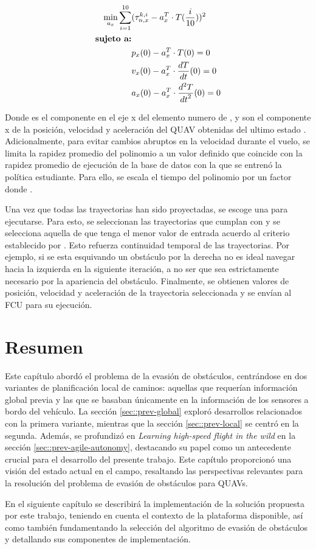 \begin{equation}
\label{eq:aoa-traj-proj}
\begin{split}
    \min_{a_x} \sum_{i=1}^{10} & (\tau_{n,x}^{k,i} - a_x^T \cdot T(\frac{i}{10}))^{2} \\
    \text{\textbf{sujeto a:}} & \\
                     & p_x(0) - a_x^T \cdot T(0) = 0 \\
                     & v_x(0) - a_x^T \cdot \frac{dT}{dt}(0) = 0 \\
                     & a_x(0) - a_x^T \cdot \frac{d^2 T}{{dt}^2}(0) = 0 \\
\end{split}
\end{equation}

Donde  es el componente en el eje x del elemento numero  de , y  son el componente x de la posición, velocidad y aceleración del QUAV obtenidas del ultimo estado . Adicionalmente, para evitar cambios abruptos en la velocidad durante el vuelo, se limita la rapidez promedio del polinomio a un valor definido  que coincide con la rapidez promedio de ejecución de la base de datos con la que se entrenó la política estudiante. Para ello, se escala el tiempo  del polinomio  por un factor  donde .

Una vez que todas las trayectorias han sido proyectadas, se escoge una para ejecutarse. Para esto, se seleccionan las trayectorias que cumplan con  y se selecciona aquella de que tenga el menor valor de entrada acuerdo al criterio establecido por \cite{mellinger2011minimum}. Esto refuerza continuidad temporal de las trayectorias. Por ejemplo, si se esta esquivando un obstáculo por la derecha no es ideal navegar hacia la izquierda en la siguiente iteración, a no ser que sea estrictamente necesario por la apariencia del obstáculo. Finalmente, se obtienen valores de posición, velocidad y aceleración de la trayectoria seleccionada y se envían al FCU para su ejecución.

\section{Resumen}

Este capítulo abordó el problema de la evasión de obstáculos, centrándose en dos variantes de planificación local de caminos: aquellas que requerían información global previa y las que se basaban únicamente en la información de los sensores a bordo del vehículo. La sección \ref{sec::prev-global} exploró desarrollos relacionados con la primera variante, mientras que la sección \ref{sec::prev-local} se centró en la segunda. Además, se profundizó en \textit{Learning high-speed flight in the wild} en la sección \ref{sec::prev-agile-autonomy}, destacando su papel como un antecedente crucial para el desarrollo del presente trabajo. Este capítulo proporcionó una visión del estado actual en el campo, resaltando las perspectivas relevantes para la resolución del problema de evasión de obstáculos para QUAVs.

En el siguiente capítulo se describirá la implementación de la solución propuesta por este trabajo, teniendo en cuenta el contexto de la plataforma disponible, así como también fundamentando la selección del algoritmo de evasión de obstáculos y detallando sus componentes de implementación.
    
   